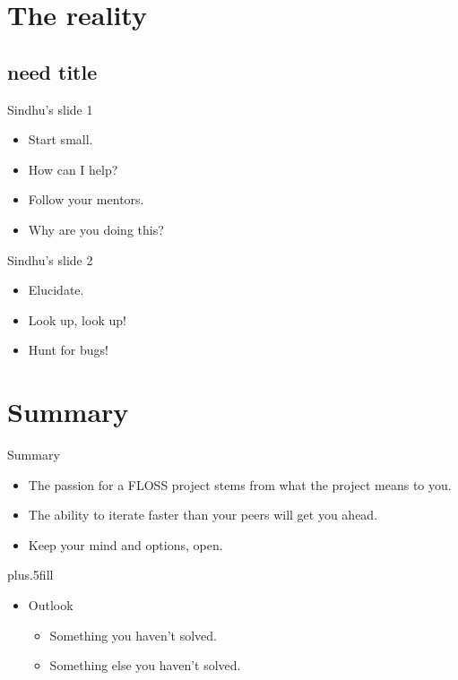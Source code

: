 \documentclass{beamer}
\begin{document}
\section{The reality}

\subsection{need title}

\begin{frame}{Sindhu's slide 1}
  \begin{itemize}
  \item
    Start small.
  \item
    How can I help?
  \item
    Follow your mentors.
   \item
    Why are you doing this?
  \end{itemize} 
\end{frame}

\begin{frame}{Sindhu's slide 2}
  \begin{itemize}
  \item
    Elucidate.
  \item
    Look up, look up!
  \item
    Hunt for bugs!
  \end{itemize} 

\end{frame}


\section*{Summary}

\begin{frame}{Summary}

  \begin{itemize}
  \item
    The \alert{passion} for a FLOSS project stems from what the project means to you.
  \item
    The \alert{ability to iterate faster than your peers} will get you ahead.
  \item
    Keep your mind and options, \alert{open}.
  \end{itemize}
  
  \vskip0pt plus.5fill
  \begin{itemize}
  \item
    Outlook
    \begin{itemize}
    \item
      Something you haven't solved.
    \item
      Something else you haven't solved.
    \end{itemize}
  \end{itemize}
\end{frame}
\end{document}
